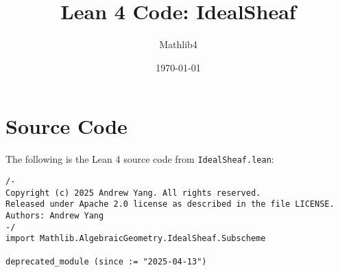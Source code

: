 \documentclass{article}
\title{Lean 4 Code: IdealSheaf}
\author{Mathlib4}
\date{\today}
\begin{document}
\maketitle

\section{Source Code}

The following is the Lean 4 source code from \texttt{IdealSheaf.lean}:

\begin{lstlisting}[language=Lean, caption={IdealSheaf.lean}]
/-
Copyright (c) 2025 Andrew Yang. All rights reserved.
Released under Apache 2.0 license as described in the file LICENSE.
Authors: Andrew Yang
-/
import Mathlib.AlgebraicGeometry.IdealSheaf.Subscheme

deprecated_module (since := "2025-04-13")

\end{lstlisting}
\end{document}
